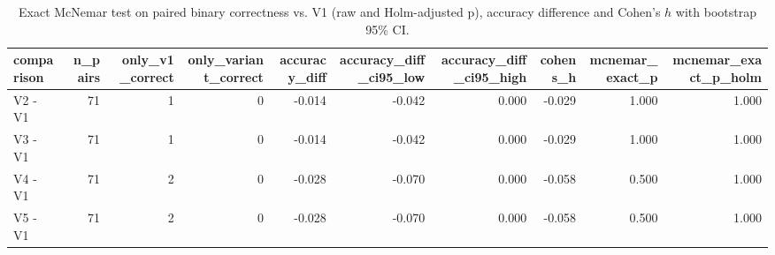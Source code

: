 \begin{table}[t]
\centering
\small
\begin{tabular}{lrrrrrrrrr}
\toprule
comparison & n\_pairs & only\_v1\_correct & only\_variant\_correct & accuracy\_diff & accuracy\_diff\_ci95\_low & accuracy\_diff\_ci95\_high & cohens\_h & mcnemar\_exact\_p & mcnemar\_exact\_p\_holm \\
\midrule
V2 - V1 & 71 & 1 & 0 & -0.014 & -0.042 & 0.000 & -0.029 & 1.000 & 1.000 \\
V3 - V1 & 71 & 1 & 0 & -0.014 & -0.042 & 0.000 & -0.029 & 1.000 & 1.000 \\
V4 - V1 & 71 & 2 & 0 & -0.028 & -0.070 & 0.000 & -0.058 & 0.500 & 1.000 \\
V5 - V1 & 71 & 2 & 0 & -0.028 & -0.070 & 0.000 & -0.058 & 0.500 & 1.000 \\
\bottomrule
\end{tabular}
\caption{Exact McNemar test on paired binary correctness vs. V1 (raw and Holm-adjusted p), accuracy difference and Cohen's $h$ with bootstrap 95\% CI.}
\label{tab:rigor_accuracy_tests}
\end{table}
